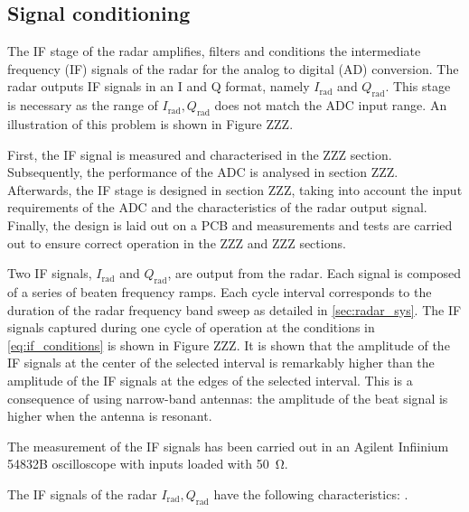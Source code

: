 \subsection{Signal conditioning}

The IF stage of the radar amplifies, filters and conditions the intermediate frequency (IF) signals of the radar for the analog to digital (AD) conversion. The radar outputs IF signals in an I and Q format, namely $I_\mathrm{rad}$ and $Q_\mathrm{rad}$. This stage is necessary as the range of $I_\mathrm{rad}, Q_\mathrm{rad}$ does not match the ADC input range. An illustration of this problem is shown in Figure ZZZ.


First, the IF signal is measured and characterised in the ZZZ section. Subsequently, the performance of the ADC is analysed in section ZZZ. Afterwards, the IF stage is designed in section ZZZ, taking into account the input requirements of the ADC and the characteristics of the radar output signal. Finally, the design is laid out on a PCB and measurements and tests are carried out to ensure correct operation in the ZZZ and ZZZ sections.

Two IF signals, $I_\mathrm{rad}$ and $Q_\mathrm{rad}$, are output from the radar. Each signal is composed of a series of beaten frequency ramps. Each cycle interval corresponds to the duration of the radar frequency band sweep as detailed in \cref{sec:radar_sys}. The IF signals captured during one cycle of operation at the conditions in \cref{eq:if_conditions} is shown in Figure ZZZ. It is shown that the amplitude of the IF signals at the center of the selected interval is remarkably higher than the amplitude of the IF signals at the edges of the selected interval. This is a consequence of using narrow-band antennas: the amplitude of the beat signal is higher when the antenna is resonant.

The measurement of the IF signals has been carried out in an Agilent Infiinium 54832B oscilloscope with inputs loaded with \SI{50}{\ohm}.

The IF signals of the radar $I_\mathrm{rad},Q_\mathrm{rad}$ have the following characteristics:
.

